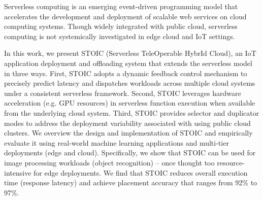 Serverless computing is an emerging event-driven programming model that accelerates the development and deployment of scalable web services on cloud computing systems. Though widely integrated with public cloud, serverless computing is not systemically investigated in edge cloud and IoT settings.

In this work, we present STOIC (Serverless TeleOperable HybrId Cloud), an IoT application deployment and offloading system that extends the serverless model in three ways. First, STOIC adopts a dynamic feedback control mechanism to precisely predict latency and dispatches workloads across multiple cloud systems under a consistent serverless framework. Second, STOIC leverages hardware acceleration (e.g. GPU resources) in serverless function execution when available from the underlying cloud system. Third, STOIC provides selector and duplicator modes to address the deployment variability associated with using public cloud clusters. We overview the design and implementation of STOIC and empirically evaluate it using real-world machine learning applications and multi-tier deployments (edge and cloud). Specifically, we show that STOIC can be used for image processing workloads (object recognition) -- once thought too resource-intensive for edge deployments. We find that STOIC reduces overall execution time (response latency) and achieve placement accuracy that ranges from 92\% to 97\%.

